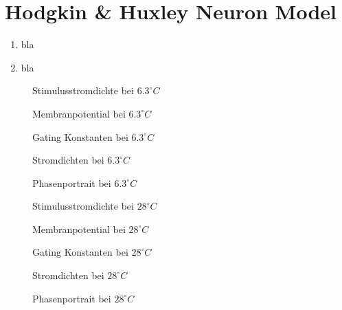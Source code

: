 \documentclass[conference]{IEEEtran}
\begin{document}
\section{Hodgkin \& Huxley Neuron Model}
\begin{enumerate}
\item bla
\item bla
\end{enumerate}

\begin{figure}[h!]
  	\centering
    \scalebox{.6}{}
    \caption{Stimulusstromdichte bei $6.3^\circ C$}
    \label{fig:Stiumulus6}
\end{figure}

\begin{figure}[h!]
  	\centering
    \scalebox{.6}{}
    \caption{Membranpotential bei $6.3^\circ C$}
    \label{fig:Membranpotential6}
\end{figure}

\begin{figure}[h!]
  	\centering
    \scalebox{.6}{}
    \caption{Gating Konstanten bei $6.3^\circ C$}
    \label{fig:Gating6}
\end{figure}

\begin{figure}[h!]
  	\centering
    \scalebox{.6}{}
    \caption{Stromdichten bei $6.3^\circ C$}
    \label{fig:Stromdichten6}
\end{figure}

\begin{figure}[h!]
  	\centering
    \scalebox{.6}{}
    \caption{Phasenportrait bei $6.3^\circ C$}
    \label{fig:Phasenportrait6}
\end{figure}

\begin{figure}[h!]
  	\centering
    \scalebox{.6}{}
    \caption{Stimulusstromdichte bei $28^\circ C$}
    \label{fig:Stiumulus28}
\end{figure}

\begin{figure}[h!]
  	\centering
    \scalebox{.6}{}
    \caption{Membranpotential bei $28^\circ C$}
    \label{fig:Membranpotential28}
\end{figure}

\begin{figure}[h!]
  	\centering
    \scalebox{.6}{}
    \caption{Gating Konstanten bei $28^\circ C$}
    \label{fig:Gating28}
\end{figure}

\begin{figure}[h!]
  	\centering
    \scalebox{.6}{}
    \caption{Stromdichten bei $28^\circ C$}
    \label{fig:Stromdichten28}
\end{figure}

\begin{figure}[h!]
  	\centering
    \scalebox{.6}{}
    \caption{Phasenportrait bei $28^\circ C$}
    \label{fig:Phasenportrait28}
\end{figure}
\end{document}
